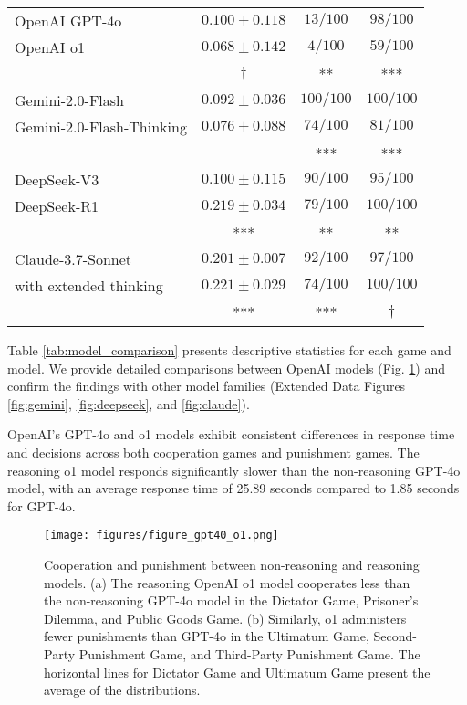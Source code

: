 \begin{table}[h]
\begin{tabular}{lccc}
        \midrule
        OpenAI GPT-4o & $0.100 \pm 0.118$ & $13/100$ & $98/100$ \\
        OpenAI o1 & $0.068 \pm 0.142$ & $4/100$ & $59/100$ \\
        & $\dagger$ & ** & ***\\
        Gemini-2.0-Flash & $0.092 \pm 0.036$ & $100/100$ & $100/100$ \\
        Gemini-2.0-Flash-Thinking & $0.076 \pm 0.088$ & $74/100$ & $81/100$ \\
        &  & *** & ***\\
        DeepSeek-V3 & $0.100 \pm 0.115$ & $90/100$ & $95/100$ \\
        DeepSeek-R1 & $0.219 \pm 0.034$ & $79/100$ & $100/100$ \\
        & *** & ** & **\\
        Claude-3.7-Sonnet & $0.201 \pm 0.007$ & $92/100$ & $97/100$ \\
        with extended thinking & $0.221 \pm 0.029$ & $74/100$ & $100/100$ \\
        & *** & ***  & $\dagger$\\
        \bottomrule
    \end{tabular}
\end{table}

                     



Table \ref{tab:model_comparison} presents descriptive statistics for each game and model.
We provide detailed comparisons between OpenAI models (Fig. \ref{fig:open_ai}) and confirm the findings with other model families (Extended Data Figures \ref{fig:gemini}, \ref{fig:deepseek}, and \ref{fig:claude}).

OpenAI's GPT-4o and o1 models exhibit consistent differences in response time and decisions across both cooperation games and punishment games.
The reasoning o1 model responds significantly slower than the non-reasoning GPT-4o model, with an average response time of 25.89 seconds compared to 1.85 seconds for GPT-4o. 

\begin{figure}[ht]
  \centering 
  \texttt{[image: figures/figure\_gpt40\_o1.png]}
  \caption{Cooperation and punishment between non-reasoning and reasoning models. (a) The reasoning OpenAI o1 model cooperates less than the non-reasoning GPT-4o model in the Dictator Game, Prisoner’s Dilemma, and Public Goods Game. (b) Similarly, o1 administers fewer punishments than GPT-4o in the Ultimatum Game, Second-Party Punishment Game, and Third-Party Punishment Game. The horizontal lines for Dictator Game and Ultimatum Game present the average of the distributions. }
  \label{fig:open_ai}
\end{figure}


